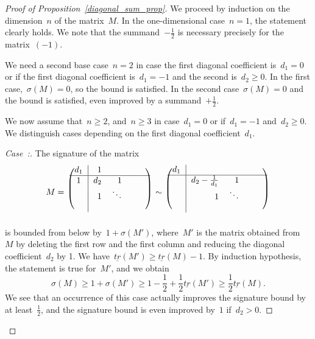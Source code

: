 \documentclass[10pt,a4paper]{amsart}
\numberwithin{equation}{section}
\newcounter{casecount}
\newenvironment{case}[1]{\refstepcounter{casecount}\begin{proof}[Case~\thecasecount:\;{#1}]}{\let\qed\relax\end{proof}}
\begin{document}
\begin{proof}[Proof of Proposition~\ref{diagonal_sum_prop}]
We proceed by induction on the dimension~$n$ of the matrix~$M$. In the one-dimensional case~$n=1$, the statement clearly holds. We note that the summand~$-\frac{1}{2}$ is necessary precisely for the matrix~$(-1)$.

We need a second base case~$n=2$ in case the first diagonal coefficient is~$d_1=0$ or if the first diagonal coefficient is~$d_1 =-1$ and the second is~$d_2\ge 0$. In the first case,~$\sigma(M) = 0$, so the bound is satisfied. In the second case~$\sigma(M)=0$ and the bound is satisfied, even improved by a summand~$+\frac{1}{2}$.

We now assume that~$n\ge2$, and~$n\ge3$ in case~$d_1 =0$ or if~$d_1= -1$ and~$d_2 \ge 0$. We distinguish cases depending on the first diagonal coefficient~$d_1$.
\begin{case}{{$d_1 \ge 1$}}%
The signature of the matrix
\begin{gather*}
M =\
\begin{blockarray}{crrrrc}
\begin{block}{(c|rrrrc)}
d_1 & 1 & \ & \ & \ \\ \BAhhline{-------------~} 1 & d_2 & 1 & \ & \ \\
\ & 1 & \ddots & & \\
\ & \ & & & \\
\end{block}
\end{blockarray}\
\sim\
\begin{blockarray}{crrrrc}
\begin{block}{(c|rrrrc)}
d_1 & & \ & \ & \ \\ \BAhhline{-------------~} & d_2-\frac{1}{d_1} & 1 & \ & \ \\
\ & 1 & \ddots & & \\
\ & \ & & & \\
\end{block}
\end{blockarray}\
\end{gather*}
is bounded from below by~$1+\sigma(M')$, where~$M'$ is the matrix obtained from~$M$ by deleting the first row and the first column and reducing the diagonal coefficient~$d_2$ by 1. We have~$\underline{tr}(M') \ge \underline{tr}(M) - 1$. By induction hypothesis, the statement is true for~$M'$, and we obtain
\[
\sigma(M) \ge 1 + \sigma(M') \ge 1 -\frac{1}{2}+ \frac{1}{2} \underline{tr}(M') \ge \frac{1}{2} \underline{tr}(M).
\]
We see that an occurrence of this case actually improves the signature bound by at least~$\frac{1}{2}$, and the signature bound is even improved by~$1$ if~$d_2 > 0$.
\end{case}


\end{proof}
\end{document}
